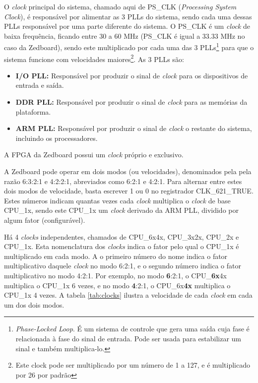 \documentclass{ufscThesis/ufscThesis} %
\begin{document}
O \emph{clock} principal do sistema, chamado aqui de PS\_CLK (\emph{Processing System Clock}), é responsável por alimentar as 3 PLLs do sistema, sendo cada uma dessas PLLs responsável por uma parte diferente do sistema\cite[p.~622]{ug585}. O PS\_CLK é um \emph{clock} de baixa frequência, ficando entre 30 a 60 MHz (PS\_CLK é igual a 33.33 MHz no caso da Zedboard), sendo este multiplicado por cada uma das 3 PLLs\footnote{\emph{Phase-Locked Loop}. É um sistema de controle que gera uma saída cuja fase é relacionada à fase do sinal de entrada. Pode ser usada para estabilizar um sinal e também multiplica-lo.} para que o sistema funcione com velocidades maiores\footnote{Este clock pode ser multiplicado por um número de 1 a 127, e é multiplicado por 26 por padrão}. As 3 PLLs são:

\begin{itemize}
	\item \textbf{I/O PLL:} Responsável por produzir o sinal de \emph{clock} para os dispositivos de entrada e saída.
	\item \textbf{DDR PLL:} Responsável por produzir o sinal de \emph{clock} para as memórias da plataforma.
	\item \textbf{ARM PLL:} Responsável por produzir o sinal de \emph{clock} o restante do sistema, incluindo os processadores.
\end{itemize}

A FPGA da Zedboard possui um \emph{clock} próprio e exclusivo.

A Zedboard pode operar em dois modos (ou velocidades), denominados pela pela razão 6:3:2:1 e 4:2:2:1, abreviados como 6:2:1 e 4:2:1. Para alternar entre estes dois modos de velocidade, basta escrever 1 ou 0 no registrador CLK\_621\_TRUE. Estes números indicam quantas vezes cada \emph{clock} multiplica o \emph{clock} de base CPU\_1x, sendo este CPU\_1x um \emph{clock} derivado da ARM PLL, dividido por algum fator (configurável).

Há 4 \emph{clocks} independentes, chamados de CPU\_6x4x, CPU\_3x2x, CPU\_2x e CPU\_1x. Esta nomenclatura dos \emph{clocks} indica o fator pelo qual o CPU\_1x é multiplicado em cada modo.
A o primeiro número do nome indica o fator multiplicativo daquele \emph{clock} no modo 6:2:1, e o segundo número indica o fator multiplicativo no modo 4:2:1.
Por exemplo, no modo \textbf{6}:2:1, o CPU\_\textbf{6x}4x multiplica o CPU\_1x 6 vezes, e no modo \textbf{4}:2:1, o CPU\_6x\textbf{4x} multiplica o CPU\_1x 4 vezes. A tabela \ref{tab:clocks} ilustra a velocidade de cada \emph{clock} em cada um dos dois modos.
\end{document}

